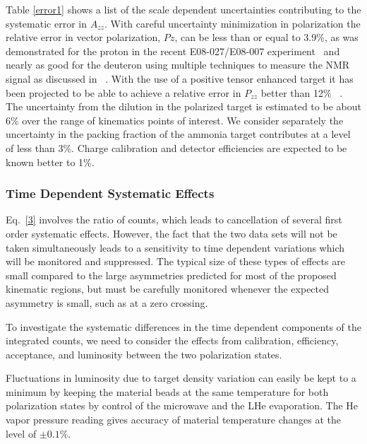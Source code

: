 Table \ref{error1} shows a list of the scale dependent uncertainties contributing to the systematic error in $A_{zz}$.
With careful uncertainty minimization in polarization the relative error in vector polarization, $Pz$, can be less than or equal to 3.9\%, as was demonstrated for the proton in the recent E08-027/E08-007 experiment~\cite{NIMDUST} and nearly as good for the deuteron using multiple techniques to measure the NMR signal as discussed in ~\cite{PTSTDUST}.  With the use of a positive tensor enhanced target it has been projected to be able to achieve a relative error in $P_{zz}$ better than 12\% ~\cite{PTSTDUST}.  The uncertainty from the dilution in the polarized target is estimated to be
about 6\% over the range of kinematics points of interest.  We consider separately the uncertainty in the packing fraction of the ammonia target contributes at a level of less than 3\%. Charge calibration and detector efficiencies are expected to be known better to 1\%. 

\subsubsection*{Time Dependent Systematic Effects}
Eq.~\ref{3} involves the ratio of counts, which leads to cancellation of several first order systematic effects.  However, the fact that the two data sets will not be taken simultaneously leads to a sensitivity to time dependent variations which will be monitored and suppressed. The typical size of these types of effects are small compared to the large asymmetries predicted for most of the proposed kinematic regions, but must be carefully monitored whenever the expected asymmetry is small, such as at a zero crossing.

%
To investigate the systematic differences in the time dependent components of the integrated counts, we need to consider the effects from calibration, efficiency, acceptance, and luminosity between the two polarization states.

Fluctuations in luminosity due to target density variation can easily be kept to a minimum by keeping the material beads at the same temperature for both polarization states by control of the microwave and the LHe evaporation.  The He vapor pressure reading gives accuracy of material temperature changes at the level of $\pm0.1\%$.

